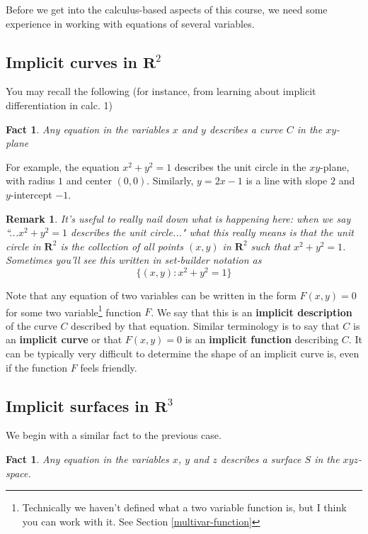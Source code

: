 \documentclass[12pt]{article}
\numberwithin{equation}{subsection}
\numberwithin{figure}{subsection}
\newtheorem{fact}[subsection]{Fact}
\theoremstyle{note}
\newtheorem{remark}[subsection]{Remark}
\begin{document}
{Before we get into the calculus-based aspects of this course, we need some experience in working with equations of several variables. 

\subsection{Implicit curves in $\mathbf{R}^2$}

You may recall the following (for instance, from learning about implicit differentiation in calc. 1)
\begin{fact} 
Any equation in the variables $x$ and $y$ describes a curve $C$ in the $xy$-plane
\end{fact}

For example, the equation $x^2+y^2=1$ describes the unit circle in the $xy$-plane, with radius $1$ and center $(0,0)$. Similarly, $y=2x-1$ is a line with slope $2$ and $y$-intercept $-1$. 

\begin{remark} It's useful to really nail down what is happening here: when we say ``...$x^2+y^2=1$ describes the unit circle..." what this really means is that the unit circle in $\mathbf{R}^2$ is the collection of all points $(x,y)$ in $\mathbf{R}^2$ such that $x^2+y^2=1$. Sometimes you'll see this written in \textit{set-builder notation} as \[ \{ (x,y) : x^2+y^2=1\}\]  \end{remark}


Note that any equation of two variables can be written in the form $F(x,y)=0$ for some two variable\footnote{Technically we haven't defined what a two variable function is, but I think you can work with it. See Section \ref{multivar-function}} function $F$. We say that this is an \textbf{implicit description} of the curve $C$ described by that equation. Similar terminology is to say that  $C$ is an \textbf{implicit curve} or that $F(x,y)=0$ is an \textbf{implicit function} describing $C$. It can be typically very difficult to determine the shape of an implicit curve is, even if the function $F$ feels friendly.

\subsection{Implicit surfaces in $\mathbf{R}^3$}
We begin with a similar fact to the previous case. 

\begin{fact}
Any equation in the variables $x$, $y$ and $z$ describes a surface $S$ in the $xyz$-space.
\end{fact}

}
\end{document}
